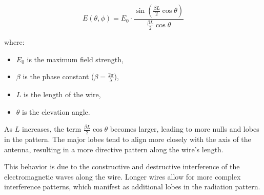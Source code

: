 \[
E(\theta, \phi) = E_0 \cdot \frac{\sin\left(\frac{\beta L}{2} \cos\theta\right)}{\frac{\beta L}{2} \cos\theta}
\]

where:
\begin{itemize}
    \item \( E_0 \) is the maximum field strength,
    \item \( \beta \) is the phase constant (\( \beta = \frac{2\pi}{\lambda} \)),
    \item \( L \) is the length of the wire,
    \item \( \theta \) is the elevation angle.
\end{itemize}

As \( L \) increases, the term \( \frac{\beta L}{2} \cos\theta \) becomes larger, leading to more nulls and lobes in the pattern. The major lobes tend to align more closely with the axis of the antenna, resulting in a more directive pattern along the wire’s length.

This behavior is due to the constructive and destructive interference of the electromagnetic waves along the wire. Longer wires allow for more complex interference patterns, which manifest as additional lobes in the radiation pattern.

